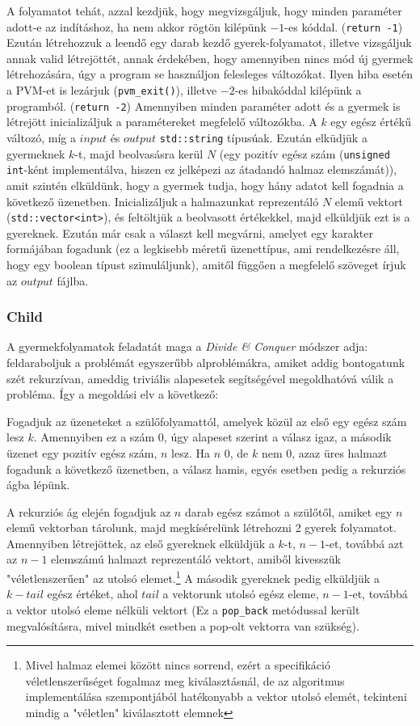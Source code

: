 \documentclass[12pt]{article}
\begin{document}
    A folyamatot tehát, azzal kezdjük, hogy megvizsgáljuk, hogy minden paraméter adott-e az indításhoz, ha nem akkor rögtön kilépünk $-1$-es kóddal. (\verb|return -1|) 
    Ezután létrehozzuk a leendő egy darab kezdő gyerek-folyamatot, illetve vizsgáljuk annak valid létrejöttét, annak érdekében, hogy amennyiben nincs mód új gyermek létrehozására, úgy a program se használjon felesleges változókat. Ilyen hiba esetén a PVM-et is lezárjuk (\verb|pvm_exit()|), illetve $-2$-es hibakóddal kilépünk a programból. (\verb|return -2|)
    Amennyiben minden paraméter adott és a gyermek is létrejött inicializáljuk  a paramétereket megfelelő változókba. A $k$ egy egész értékű változó, míg a $input$ és $output$ \verb|std::string| típusúak.
    Ezután elküdjük a gyermeknek $k$-t, majd beolvasásra kerül $N$ (egy pozitív egész szám (\verb|unsigned int|-ként implementálva, hiszen ez jelképezi az átadandó halmaz elemszámát)), amit szintén elküldünk, hogy a gyermek tudja, hogy hány adatot kell fogadnia a következő üzenetben. Inicializáljuk a halmazunkat reprezentáló $N$ elemű vektort (\verb|std::vector<int>|), és feltöltjük a beolvasott értékekkel, majd elküldjük ezt is a gyereknek.
    Ezután már csak a választ kell megvárni, amelyet egy karakter formájában fogadunk (ez a legkisebb méretű üzenettípus, ami rendelkezésre áll, hogy egy boolean típust szimuláljunk), amitől függően a megfelelő szöveget írjuk az $output$ fájlba.

	\subsubsection{Child}
    
    A gyermekfolyamatok feladatát maga a \textit{Divide \& Conquer} módszer adja: feldaraboljuk a problémát egyszerűbb alproblémákra, amiket addig bontogatunk szét rekurzívan, ameddig triviális alapesetek segítségével megoldhatóvá válik a probléma.
    Így a megoldási elv a következő:
    
    Fogadjuk az üzeneteket a szülőfolyamattól, amelyek közül az első egy egész szám lesz $k$. Amennyiben ez a szám 0, úgy alapeset szerint a válasz igaz, a második üzenet egy pozitív egész szám, $n$ lesz. Ha $n$ 0, de $k$ nem 0, azaz üres halmazt fogadunk a következő üzenetben, a válasz hamis, egyés esetben pedig a rekurziós ágba lépünk.
    
    A rekurziós ág elején fogadjuk az $n$ darab egész számot a szülőtől, amiket egy $n$ elemű vektorban tárolunk, majd megkísérelünk létrehozni 2 gyerek folyamatot. Amennyiben létrejöttek, az első gyereknek elküldjük a $k$-t, $n-1$-et, továbbá azt az $n-1$ elemszámú halmazt reprezentáló vektort, amiből kivesszük "véletlenszerűen" az utolsó elemet.\footnote{Mivel halmaz elemei között nincs sorrend, ezért a specifikáció véletlenszerűséget fogalmaz meg kiválasztásnál, de az algoritmus implementálása szempontjából hatékonyabb a vektor utolsó elemét, tekinteni mindig a "véletlen" kiválasztott elemnek}
A második gyereknek pedig elküldjük a $k-tail$ egész értéket, ahol $tail$ a vektorunk utolsó egész eleme, $n-1$-et, továbbá a vektor utolsó eleme nélküli vektort (Ez a \verb|pop_back| metódussal került megvalósításra, mivel mindkét esetben a pop-olt vektorra van szükség).
\end{document}

